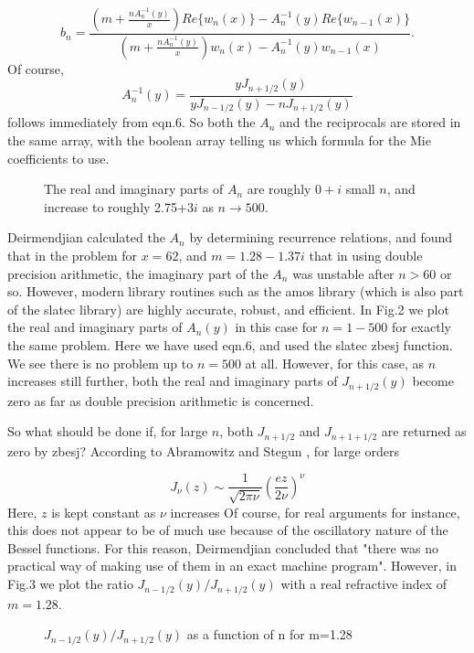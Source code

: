 \begin{equation}
b_n=\frac{ \left ( 
m +\frac{n A^{-1}_n(y)}{x}
 \right )
Re \lbrace w_n(x) \rbrace -A^{-1}_n(y) Re \lbrace w_{n-1}(x) \rbrace
}
{ \left ( 
m +\frac{n A^{-1}_n(y)}{x} 
\right )
 w_n(x) - A^{-1}_n(y) w_{n-1}(x) }.
\end{equation}
Of course,
\begin{equation}
A_n^{-1}(y)=\frac{ y J_{n+1/2}(y)}
                 { y J_{n-1/2}(y)-n J_{n+1/2}(y) }
\end{equation}
follows immediately from eqn.6. So both the $A_n$ and the reciprocals are stored in the same array, with the boolean array telling us which formula for
the Mie coefficients to use.
\vspace*{11cm}
\begin{figure}[htb]
\caption{ The real and imaginary parts of $A_n$ are roughly $0+i$
 small $n$, and increase to roughly 2.75+3$i$ as $n \rightarrow 500$.}
\end{figure}

Deirmendjian calculated the $A_n$ by determining recurrence relations, and found that in the problem for $x=62$, and $m=1.28-1.37i$ that in using double
precision arithmetic, the imaginary part of
the $A_n$ was unstable after $n>60$ or so. However, modern library routines such as the amos library (which is also part of the slatec library) are highly accurate, robust, and efficient. In Fig.2 we plot the real and imaginary parts
of $A_n(y)$ in this case for $n=1 - 500$ for exactly the same problem.  
Here we have used eqn.6, and used the slatec zbesj function. We see there is no problem up to $n=500$ at all.
However, for this case, as $n$ increases still further, both the real and
imaginary parts of $J_{n+1/2}(y)$ become zero as far as double precision
arithmetic is concerned. 

So what should be done if,  for large $n$, both $J_{n+1/2}$ 
and $J_{n+1+1/2}$ 
are returned as zero by zbesj? According to Abramowitz and Stegun
  \cite{AbramowitzStegun:Mybib},  for large orders

\begin{equation}
J_\nu(z) \sim \frac{1}{\sqrt{2 \pi \nu}} 
\left ( \frac{ez}{ 2 \nu} \right )^\nu
\end{equation}
Here, $z$ is kept constant as $\nu$ increases
Of course, for real arguments for instance, this does not appear to be
of much use because of the oscillatory nature of the Bessel functions.
For this reason, Deirmendjian concluded that "there was no practical way 
of making use of them in an exact machine program".
However, in Fig.3 we plot the ratio $J_{n-1/2}(y)/J_{n+1/2}(y)$ 
with a real refractive index of $m=1.28$.
\vspace*{11cm}
\begin{figure}[htb]
\caption{ $J_{n-1/2}(y)/J_{n+1/2}(y)$ as a function of n for m=1.28 }
\end{figure}

